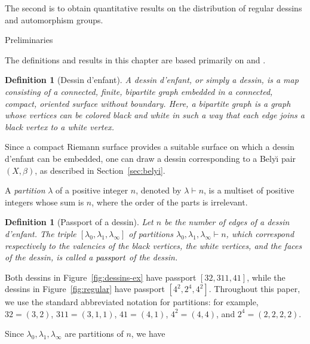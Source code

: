 \documentclass[12pt,reqno]{amsart}
\makeatletter
\newif\if@noindentafterheading
\renewcommand\section{\@startsection{section}{1}{\z@}%
  {-3.5ex \@plus -1ex \@minus -.2ex}%
  {2.6ex \@plus .2ex}%
  {\normalfont\large\bfseries}%
}
\let\orig@section\section
\renewcommand\section{%
  \@ifstar{\section@star}{\section@nostar}%
}
\newcommand\section@nostar{%
  \@ifnextchar[{\section@opt}{\section@noopt}%
}
\newcommand\section@opt[2][]{%
  \global\@noindentafterheadingtrue
  \orig@section[#1]{#2}%
  \global\@noindentafterheadingfalse
}
\newcommand\section@noopt[1]{%
  \global\@noindentafterheadingtrue
  \orig@section{#1}%
  \global\@noindentafterheadingfalse
}
\newcommand\section@star[1]{%
  \global\@noindentafterheadingtrue
  \orig@section*{#1}%
  \global\@noindentafterheadingfalse
}
\newcommand{\B}{\beta}									%
\newcommand{\la}{\lambda}								%
\newcommand{\HL}{\vspace{2mm}}							%
\theoremstyle{mythmstyle}
\theoremstyle{mydefstyle}
\newtheorem{definition}[lemma]{Definition}
\newcommand{\figref}[1]{Figure~\ref{#1}}
\newcommand{\belyi}{Bely\u{\i}\xspace}
\newcommand{\dde}{dessin d'enfant\xspace}
\newcommand{\Dde}{Dessin d'enfant\xspace}
\numberwithin{equation}{section}
\makeatother
\begin{document}
The second is to obtain quantitative results on the distribution of regular
dessins and automorphism groups.

\section{Preliminaries}

The definitions and results in this chapter are based primarily on \cite{Jones16} and \cite{Adrianov20}.

\begin{definition}[\Dde]\cite[Definition~2]{Jones16}
\label{def:dessin}
A \emph{\dde}, or simply a \emph{dessin}, is a map consisting of a connected, finite, bipartite graph embedded
in a connected, compact, oriented surface without boundary.
Here, a bipartite graph is a graph whose vertices can be colored black and white in such a way that each edge
joins a black vertex to a white vertex.
\end{definition}

Since a compact Riemann surface provides a suitable surface on which a \dde can be embedded,
one can draw a dessin corresponding to a \belyi pair $(X, \B)$, as described in
Section~\ref{sec:belyi}.

\HL

A \emph{partition} $\la$ of a positive integer $n$, denoted by $\la \vdash n$, is a multiset of
positive integers whose sum is $n$, where the order of the parts is irrelevant.
 
\begin{definition}[Passport of a dessin]\cite[Definition~2.10]{Adrianov20}
\label{def:passport}
Let $n$ be the number of edges of a \dde.
The triple $[\lambda_{0}, \lambda_{1}, \lambda_{\infty}]$ of partitions $\lambda_{0}, \lambda_{1}, \lambda_{\infty} \vdash n$,
which correspond respectively to the valencies of the black vertices, the white vertices, and
the faces of the dessin, is called a $\emph{passport}$ of the dessin.
\end{definition}

Both dessins in \figref{fig:dessins-ex} have passport $[32,311,41]$,
while the dessins in \figref{fig:regular} have passport
$[4^{2},2^{4},4^{2}]$.
Throughout this paper, we use the standard abbreviated notation for partitions:
for example, $32=(3,2)$, $311=(3,1,1)$, $41=(4,1)$, $4^{2}=(4,4)$, and $2^{4}=(2,2,2,2)$.

Since $\lambda_{0}, \lambda_{1}, \lambda_{\infty}$ are partitions of $n$, we have
\end{document}
